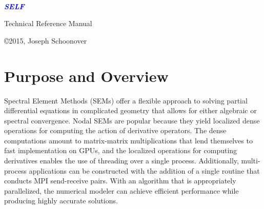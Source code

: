 \documentclass[12pt]{softwaremanual}
\author{Joseph Schoonover, Yuliana Zamora, Priscilla Kelly, Neelam Patel, Jennifer Estrada}
\title{}
\date{}
\begin{document}
\begin{titlingpage}
    
        \vspace*{2cm}
        
     \begin{flushright}
        {\selectfont
        \\
        }
       
        \vspace{1cm}
        
        \huge{
        \textbf{
        \textit{
        \textcolor{blue}{
           SELF
        }}}}
        
     \end{flushright}
         
        \vspace{2cm}
        
     \begin{center}
     
        {\selectfont
        \huge{
           Technical Reference Manual
        }
        
        \vspace{1.5cm}
        
        \textbf{
        \large{
           \theauthor 
         }}}
        
        \vfill
        
        \copyright 2015, Joseph Schoonover
        
     \end{center}
        
    
\end{titlingpage}



\tableofcontents

\pagestyle{myheadings}
\chapter{Purpose and Overview}
 Spectral Element Methods (SEMs) offer a flexible approach to solving partial differential equations in complicated geometry that allows for either algebraic or spectral convergence. Nodal SEMs are popular because they yield localized dense operations for computing the action of derivative operators. The dense computations amount to matrix-matrix multiplications that lend themselves to fast implementation on GPUs, and the localized operations for computing derivatives enables the use of threading over a single process. Additionally, multi-process applications can be constructed with the addition of a single routine that conducts MPI send-receive pairs. With an algorithm that is appropriately parallelized, the numerical modeler can achieve efficient performance while producing highly accurate solutions. 
 
\end{document}
